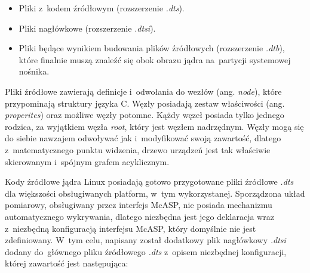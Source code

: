 \begin{itemize}

    \item Pliki z~kodem źródłowym (rozszerzenie \textit{.dts}).

    \item Pliki nagłówkowe (rozszerzenie \textit{.dtsi}).

    \item Pliki będące wynikiem budowania plików źródłowych (rozszerzenie
    \textit{.dtb}), które finalnie muszą znaleźć się obok obrazu jądra
    na~partycji systemowej nośnika.

\end{itemize}

Pliki źródłowe zawierają definicje i~odwołania do wezłów (ang. \textit{node}),
które przypominają struktury języka C. Węzły posiadają zestaw właściwości (ang.
\textit{properites}) oraz możliwe węzły potomne. Kążdy węzeł posiada tylko
jednego rodzica, za wyjątkiem węzła \textit{root}, który jest węzłem nadrzędnym.
Węzły mogą się do siebie nawzajem odwoływać jak i~modyfikować swoją zawartość,
dlatego z~matematycznego punktu widzenia, drzewo urządzeń jest tak właściwie
skierowanym i~spójnym grafem acyklicznym. \par Kody źródłowe jądra Linux
posiadają gotowo przygotowane pliki źródłowe \textit{.dts} dla większości
obsługiwanych platform, w~tym wykorzystanej. Sporządzona układ pomiarowy,
obsługiwany przez interfejs McASP, nie posiada mechanizmu automatycznego
wykrywania, dlatego niezbędna jest jego deklaracja wraz z~niezbędną konfiguracją
interfejsu McASP, który domyślnie nie jest zdefiniowany. W~tym celu, napisany
został dodatkowy plik nagłówkowy \textit{.dtsi} dodany do~głównego pliku
źródłowego \textit{.dts} z~opisem niezbędnej konfiguracji, której zawartość jest
następująca:
